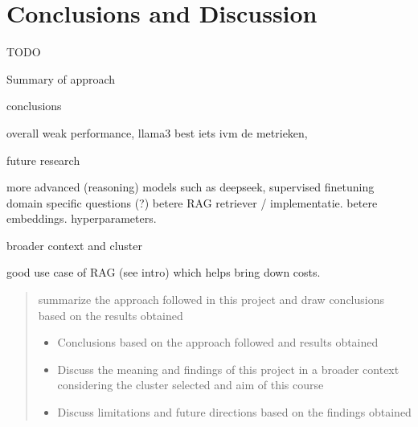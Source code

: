\documentclass[]{article}
\begin{document}
\section{Conclusions and Discussion} \label{sec:conclusions}

TODO

Summary of approach

conclusions

overall weak performance, llama3 best
iets ivm de metrieken,

future research

more advanced (reasoning) models such as deepseek,
supervised finetuning
domain specific questions (?)
betere RAG retriever / implementatie.  betere embeddings.  hyperparameters.

broader context and cluster

good use case of RAG (see intro) which helps bring down costs.


\begin{quotation}
    summarize the approach followed in this project and draw conclusions based on the results obtained
    \begin{itemize}
        \item Conclusions based on the approach followed and results obtained
        \item Discuss the meaning and findings of this project in a broader context considering the cluster selected and aim of this course
        \item Discuss limitations and future directions based on the findings obtained
    \end{itemize}
\end{quotation}

\printbibliography
\end{document}

